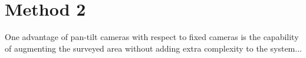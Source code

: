 \chapter{Method 2}
\label{sec:meth2}

One advantage of pan-tilt cameras with respect to fixed cameras is the capability of augmenting the surveyed area without adding extra complexity to the system...
